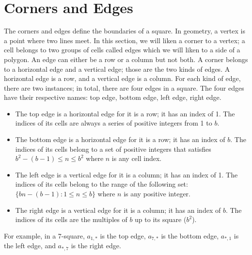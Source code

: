 \documentclass[letterpaper, twoside,12pt]{article}
\begin{document}
    \section{Corners and Edges} \label{corners_and_edges}
    The corners and edges define the boundaries of a square. In geometry, a vertex is a point where two lines meet. In this section, we will liken a corner to a vertex; a cell belongs to two groups of cells called edges which we will liken to a side of a polygon. An edge can either be a row or a column but not both. A corner belongs to a horizontal edge and a vertical edge; those are the two kinds of edges. A horizontal edge is a row, and a vertical edge is a column. For each kind of edge, there are two instances; in total, there are four edges in a square. The four edges have their respective names: top edge, bottom edge, left edge, right edge.
    \begin{itemize}
        \item The top edge is a horizontal edge for it is a row; it has an index of 1. The indices of its cells are always a series of positive integers from 1 to $b$.
        \item The bottom edge is a horizontal edge for it is a row; it has an index of $b$. The indices of its cells belong to a set of positive integers that satisfies $b^2 - (b - 1) \leq n \leq b^2$ where $n$ is any cell index.
        \item The left edge is a vertical edge for it is a column; it has an index of 1. The indices of its cells belong to the range of the following set: $\{bn - (b - 1) : 1 \leq n \leq b\}$ where $n$ is any positive integer.
        \item The right edge is a vertical edge for it is a column; it has an index of $b$. The indices of its cells are the multiples of $b$ up to its square ($b^2$).
    \end{itemize}

    For example, in a 7-square, $a_{1,*}$ is the top edge, $a_{7,*}$ is the bottom edge, $a_{*,1}$ is the left edge, and $a_{*,7}$ is the right edge.
\end{document}
